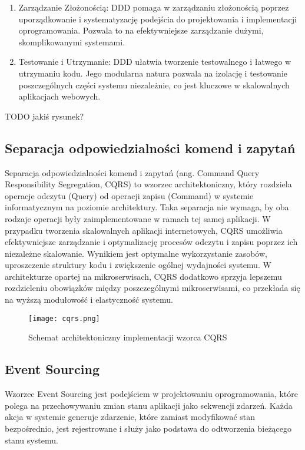 \begin{enumerate}
    \item Zarządzanie Złożonością: DDD pomaga w zarządzaniu złożonością poprzez uporządkowanie i systematyzację podejścia do projektowania i implementacji oprogramowania. Pozwala to na efektywniejsze zarządzanie dużymi, skomplikowanymi systemami.

    \item Testowanie i Utrzymanie: DDD ułatwia tworzenie testowalnego i łatwego w utrzymaniu kodu. Jego modularna natura pozwala na izolację i testowanie poszczególnych części systemu niezależnie, co jest kluczowe w skalowalnych aplikacjach webowych.
\end{enumerate}

TODO jakiś rysunek?

\subsection{Separacja odpowiedzialności komend i zapytań}

Separacja odpowiedzialności komend i zapytań (ang. Command Query Responsibility Segregation, CQRS) to wzorzec architektoniczny, który rozdziela operacje odczytu (Query) od operacji zapisu (Command) w systemie informatycznym na poziomie architektury. Taka separacja nie wymaga, by oba rodzaje operacji były zaimplementowane w ramach tej samej aplikacji. W przypadku tworzenia skalowalnych aplikacji internetowych, CQRS umożliwia efektywniejsze zarządzanie i optymalizację procesów odczytu i zapisu poprzez ich niezależne skalowanie. Wynikiem jest optymalne wykorzystanie zasobów, uproszczenie struktury kodu i zwiększenie ogólnej wydajności systemu. W architekturze opartej na mikroserwisach, CQRS dodatkowo sprzyja lepszemu rozdzieleniu obowiązków między poszczególnymi mikroserwisami, co przekłada się na wyższą modułowość i elastyczność systemu.

\begin{figure}[!h]
    \centering \texttt{[image: cqrs.png]}
    \caption{Schemat architektoniczny implementacji wzorca CQRS}
\end{figure}

\subsection{Event Sourcing}

Wzorzec Event Sourcing jest podejściem w projektowaniu oprogramowania, które polega na przechowywaniu zmian stanu aplikacji jako sekwencji zdarzeń. Każda akcja w systemie generuje zdarzenie, które zamiast modyfikować stan bezpośrednio, jest rejestrowane i służy jako podstawa do odtworzenia bieżącego stanu systemu.

